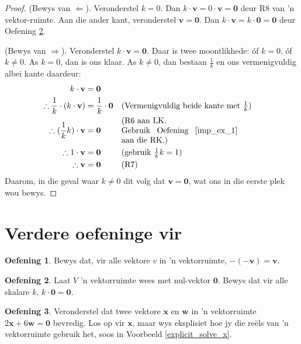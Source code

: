 \documentclass[a4paper,11pt]{book}
\theoremstyle{definition}
\newtheorem{exercise}{Oefening}
\newcommand{\ve}[1]{\mathbf{#1}}
\newcommand{\furtherexercises}{\section*{Verdere oefeninge vir
\thesection}}
\begin{document}
\begin{proof} (Bewys van $\Leftarrow$). Veronderstel $k=0$. Dan $k
	\cdot \ve{v} = 0 \cdot \ve{v} = \ve{0}$ deur R8 van 'n vektor-ruimte.
	Aan die ander kant, veronderstel $\ve{v} = \ve{0}$. Dan $k \cdot \ve{v}
	= k \cdot \ve{0} = \ve{0}$ deur Oefening \ref{imp_ex_1}.

	(Bewys van $\Rightarrow$). Veronderstel $k \cdot \ve{v} = \ve{0}$. Daar
	is twee moontlikhede: óf $k = 0$, óf $k \neq 0$. As $k=0$, dan is ons
	klaar. As $k \neq 0$, dan bestaan $\frac{1}{k}$ en ons vermenigvuldig
	albei kante daardeur:
	\begin{align*}
		k \cdot \ve{v} & = \ve{0} \\
		\therefore  \frac{1}{k} \cdot (k \cdot \ve{v})  & = \frac{1}{k}
		\cdot \ve{0} && \mbox{(Vermenigvuldig beide kante met
		$\frac{1}{k}$)} \\
		\therefore (\frac{1}{k} k) \cdot \ve{v} &= \ve{0} &&
		\mbox{\begin{minipage}{5cm} (R6 aan LK. \\ Gebruik Oefening
		\ref{imp_ex_1} aan die RK.) \end{minipage} } \\
		\therefore 1 \cdot \ve{v} &= \ve{0} && \mbox{(gebruik $\frac{1}{k}
		k = 1$)} \\
		\therefore \ve{v} &= \ve{0} && \mbox{(R7)}
	\end{align*}
	Daarom, in die geval waar $k \neq 0$ dit volg dat $\ve{v} = \ve{0}$,
	wat ons in die eerste plek wou bewys.
\end{proof}



\furtherexercises
\begin{exercise} Bewys dat, vir alle vektore $v$ in 'n vektorruimte,
	$-(-\ve{v}) = \ve{v}$.
\end{exercise}


\begin{exercise} Laat $V$ 'n vektorruimte wees met nul-vektor $\ve{0}$.
	Bewys dat vir alle skalare $k$, $k \cdot \ve{0} = \ve{0}$.
	\label{imp_ex_1}
\end{exercise}

\begin{exercise} Veronderstel dat twee vektore $\ve{x}$ en $\ve{w}$ in 'n
	vektorruimte $2 \ve{x} + 6 \ve{w} = \ve{0}$ bevredig. Los op vir
	$\ve{x}$, maar wys eksplisiet hoe jy die re{\"e}ls van 'n vektorruimte
	gebruik het, soos in Voorbeeld \ref{explicit_solve_x}.
\end{exercise}
\end{document}
